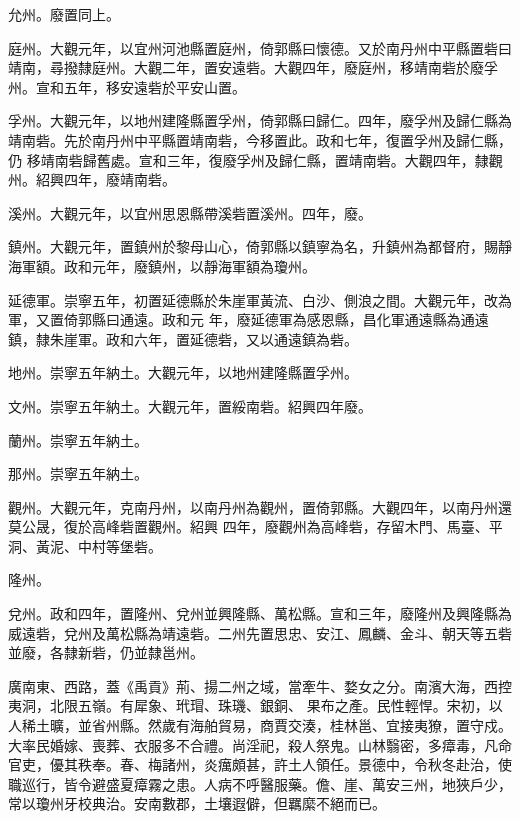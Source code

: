 \begin{pinyinscope}
 允州。廢置同上。



 庭州。大觀元年，以宜州河池縣置庭州，倚郭縣曰懷德。又於南丹州中平縣置砦曰靖南，尋撥隸庭州。大觀二年，置安遠砦。大觀四年，廢庭州，移靖南砦於廢孚州。宣和五年，移安遠砦於平安山置。



 孚州。大觀元年，以地州建隆縣置孚州，倚郭縣曰歸仁。四年，廢孚州及歸仁縣為靖南砦。先於南丹州中平縣置靖南砦，今移置此。政和七年，復置孚州及歸仁縣，仍
 移靖南砦歸舊處。宣和三年，復廢孚州及歸仁縣，置靖南砦。大觀四年，隸觀州。紹興四年，廢靖南砦。



 溪州。大觀元年，以宜州思恩縣帶溪砦置溪州。四年，廢。



 鎮州。大觀元年，置鎮州於黎母山心，倚郭縣以鎮寧為名，升鎮州為都督府，賜靜海軍額。政和元年，廢鎮州，以靜海軍額為瓊州。



 延德軍。崇寧五年，初置延德縣於朱崖軍黃流、白沙、側浪之間。大觀元年，改為軍，又置倚郭縣曰通遠。政和元
 年，廢延德軍為感恩縣，昌化軍通遠縣為通遠鎮，隸朱崖軍。政和六年，置延德砦，又以通遠鎮為砦。



 地州。崇寧五年納土。大觀元年，以地州建隆縣置孚州。



 文州。崇寧五年納土。大觀元年，置綏南砦。紹興四年廢。



 蘭州。崇寧五年納土。



 那州。崇寧五年納土。



 觀州。大觀元年，克南丹州，以南丹州為觀州，置倚郭縣。大觀四年，以南丹州還莫公晟，復於高峰砦置觀州。紹興
 四年，廢觀州為高峰砦，存留木門、馬臺、平洞、黃泥、中村等堡砦。



 隆州。



 兌州。政和四年，置隆州、兌州並興隆縣、萬松縣。宣和三年，廢隆州及興隆縣為威遠砦，兌州及萬松縣為靖遠砦。二州先置思忠、安江、鳳麟、金斗、朝天等五砦並廢，各隸新砦，仍並隸邕州。



 廣南東、西路，蓋《禹貢》荊、揚二州之域，當牽牛、婺女之分。南濱大海，西控夷洞，北限五嶺。有犀象、玳瑁、珠璣、銀銅、
 果布之產。民性輕悍。宋初，以人稀土曠，並省州縣。然歲有海舶貿易，商賈交湊，桂林邕、宜接夷獠，置守戍。大率民婚嫁、喪葬、衣服多不合禮。尚淫祀，殺人祭鬼。山林翳密，多瘴毒，凡命官吏，優其秩奉。春、梅諸州，炎癘頗甚，許土人領任。景德中，令秋冬赴治，使職巡行，皆令避盛夏瘴霧之患。人病不呼醫服藥。儋、崖、萬安三州，地狹戶少，常以瓊州牙校典治。安南數郡，土壤遐僻，但羈縻不絕而已。




\end{pinyinscope}
